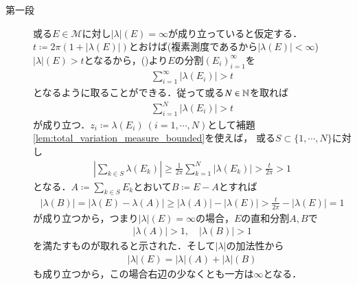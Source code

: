 	\begin{prf}\mbox{}
		\begin{description}
		\item[第一段]
			或る$E \in \mathcal{M}$に対し$|\lambda|(E) = \infty$が成り立っていると仮定する．
			$t \coloneqq 2\pi(1 + |\lambda(E)|)$とおけば({\scriptsize 複素測度であるから$|\lambda(E)| < \infty$})
			$|\lambda|(E) > t$となるから，()より$E$の分割$(E_i)_{i=1}^{\infty}$を
			\begin{align}
				\sum_{i=1}^{\infty} |\lambda(E_i)| > t
			\end{align}
			となるように取ることができる．従って或る$N \in \mathbb{N}$を取れば
			\begin{align}
				\sum_{i=1}^{N} |\lambda(E_i)| > t
			\end{align}
			が成り立つ．$z_i \coloneqq \lambda(E_i)\ (i=1,\cdots,N)$として補題\ref{lem:total_variation_measure_bounded}を使えば，
			或る$S \subset \{1,\cdots,N\}$に対し
			\begin{align}
				\left| \sum_{k \in S} \lambda(E_k) \right| \geq \frac{1}{2\pi} \sum_{k=1}^{N} |\lambda(E_k)| > \frac{t}{2\pi} > 1
			\end{align}
			となる．$A \coloneqq \sum_{k \in S} E_k$とおいて$B \coloneqq E - A$とすれば
			\begin{align}
				|\lambda(B)| = |\lambda(E)-\lambda(A)| \geq |\lambda(A)| - |\lambda(E)| > \frac{t}{2\pi} - |\lambda(E)| = 1
			\end{align}
			が成り立つから，つまり$|\lambda|(E) = \infty$の場合，$E$の直和分割$A,B$で
			\begin{align}	
				|\lambda(A)| > 1, \quad |\lambda(B)| > 1
			\end{align}
			を満たすものが取れると示された．そして$|\lambda|$の加法性から
			\begin{align}
				|\lambda|(E) = |\lambda|(A) + |\lambda|(B)
			\end{align}
			も成り立つから，この場合右辺の少なくとも一方は$\infty$となる．
		

\end{description}
\end{prf}
